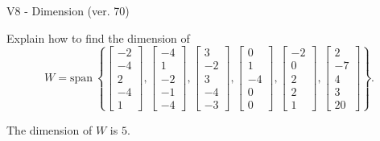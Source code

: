 \begin{exercise}
  \begin{exerciseTitle}V8 - Dimension (ver. 70)\end{exerciseTitle}
  \begin{exerciseStatement}
    Explain how to find the dimension of 
\[W=\mathrm{span}\ \left\{\left[\begin{array}{r}
-2 \\
-4 \\
2 \\
-4 \\
1
\end{array}\right] , \left[\begin{array}{r}
-4 \\
1 \\
-2 \\
-1 \\
-4
\end{array}\right] , \left[\begin{array}{r}
3 \\
-2 \\
3 \\
-4 \\
-3
\end{array}\right] , \left[\begin{array}{r}
0 \\
1 \\
-4 \\
0 \\
0
\end{array}\right] , \left[\begin{array}{r}
-2 \\
0 \\
2 \\
2 \\
1
\end{array}\right] , \left[\begin{array}{r}
2 \\
-7 \\
4 \\
3 \\
20
\end{array}\right]\right\}.\]



  \end{exerciseStatement}
  \begin{exerciseAnswer}
   The dimension of \(W\) is  \(5\).
  


  \end{exerciseAnswer}
\end{exercise}